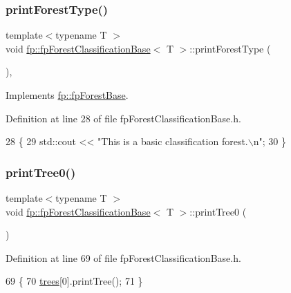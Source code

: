 \subsubsection{\texorpdfstring{print\+Forest\+Type()}{printForestType()}}
{\footnotesize\ttfamily template$<$typename T $>$ \\
void \hyperlink{classfp_1_1fpForestClassificationBase}{fp\+::fp\+Forest\+Classification\+Base}$<$ T $>$\+::print\+Forest\+Type (\begin{DoxyParamCaption}{ }\end{DoxyParamCaption})\hspace{0.3cm}{\ttfamily [inline]}, {\ttfamily [virtual]}}



Implements \hyperlink{classfp_1_1fpForestBase_a5e200f603cca94bb5d9f357489f07e97}{fp\+::fp\+Forest\+Base}.



Definition at line 28 of file fp\+Forest\+Classification\+Base.\+h.


\begin{DoxyCode}
28                                   \{
29                 std::cout << \textcolor{stringliteral}{"This is a basic classification forest.\(\backslash\)n"};
30             \}
\end{DoxyCode}
\mbox{\label{classfp_1_1fpForestClassificationBase_a1989f90fbd27ac90232b7a1071c96a00}} 
\subsubsection{\texorpdfstring{print\+Tree0()}{printTree0()}}
{\footnotesize\ttfamily template$<$typename T $>$ \\
void \hyperlink{classfp_1_1fpForestClassificationBase}{fp\+::fp\+Forest\+Classification\+Base}$<$ T $>$\+::print\+Tree0 (\begin{DoxyParamCaption}{ }\end{DoxyParamCaption})\hspace{0.3cm}{\ttfamily [inline]}}



Definition at line 69 of file fp\+Forest\+Classification\+Base.\+h.


\begin{DoxyCode}
69                              \{
70                 \hyperlink{classfp_1_1fpForestClassificationBase_a51482a6c95c4b3cb42627f029c2d4662}{trees}[0].printTree();
71             \}
\end{DoxyCode}
\mbox{\label{classfp_1_1fpForestClassificationBase_a3f1ad5a5cfb3633713d0a81bd1c356e8}} 
